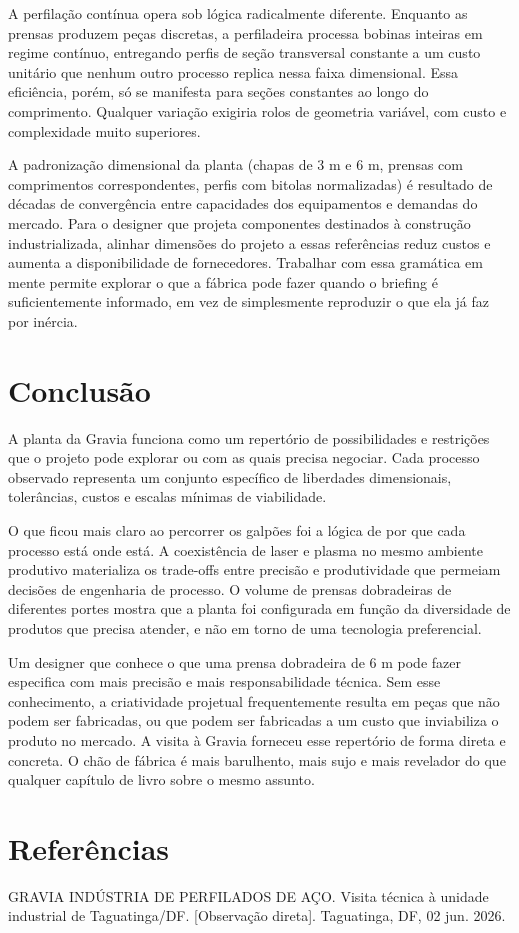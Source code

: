 \documentclass[
  12pt,
  a4paper,
  oneside,
  brazil,
  chapter=TITLE
]{article}
\newcommand{\secbreak}{\clearpage}
\let\oldsection\section
\renewcommand{\section}{\secbreak\oldsection}
\begin{document}
A perfilação contínua opera sob lógica radicalmente diferente. Enquanto as prensas produzem peças discretas, a perfiladeira processa bobinas inteiras em regime contínuo, entregando perfis de seção transversal constante a um custo unitário que nenhum outro processo replica nessa faixa dimensional. Essa eficiência, porém, só se manifesta para seções constantes ao longo do comprimento. Qualquer variação exigiria rolos de geometria variável, com custo e complexidade muito superiores.

A padronização dimensional da planta (chapas de 3 m e 6 m, prensas com comprimentos correspondentes, perfis com bitolas normalizadas) é resultado de décadas de convergência entre capacidades dos equipamentos e demandas do mercado. Para o designer que projeta componentes destinados à construção industrializada, alinhar dimensões do projeto a essas referências reduz custos e aumenta a disponibilidade de fornecedores. Trabalhar com essa gramática em mente permite explorar o que a fábrica pode fazer quando o briefing é suficientemente informado, em vez de simplesmente reproduzir o que ela já faz por inércia.

\section{Conclusão}

A planta da Gravia funciona como um repertório de possibilidades e restrições que o projeto pode explorar ou com as quais precisa negociar. Cada processo observado representa um conjunto específico de liberdades dimensionais, tolerâncias, custos e escalas mínimas de viabilidade.

O que ficou mais claro ao percorrer os galpões foi a lógica de por que cada processo está onde está. A coexistência de laser e plasma no mesmo ambiente produtivo materializa os trade-offs entre precisão e produtividade que permeiam decisões de engenharia de processo. O volume de prensas dobradeiras de diferentes portes mostra que a planta foi configurada em função da diversidade de produtos que precisa atender, e não em torno de uma tecnologia preferencial.

Um designer que conhece o que uma prensa dobradeira de 6 m pode fazer especifica com mais precisão e mais responsabilidade técnica. Sem esse conhecimento, a criatividade projetual frequentemente resulta em peças que não podem ser fabricadas, ou que podem ser fabricadas a um custo que inviabiliza o produto no mercado. A visita à Gravia forneceu esse repertório de forma direta e concreta. O chão de fábrica é mais barulhento, mais sujo e mais revelador do que qualquer capítulo de livro sobre o mesmo assunto.

\section{Referências}\label{referencias}

GRAVIA INDÚSTRIA DE PERFILADOS DE AÇO. Visita técnica à unidade industrial de Taguatinga/DF. [Observação direta]. Taguatinga, DF, 02 jun. 2026.
\end{document}
